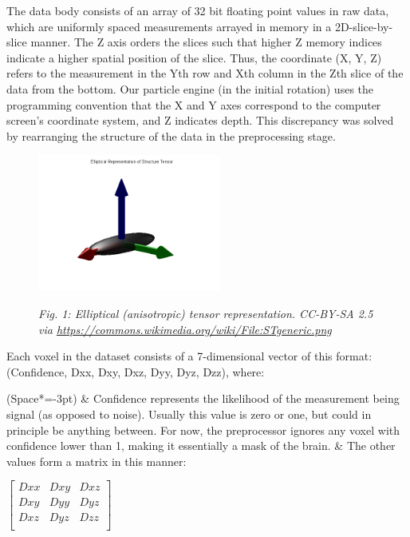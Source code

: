 \documentclass{article}
\begin{document}
The data body consists of an array of 32 bit floating point values in raw data, which are uniformly spaced measurements arrayed in memory in a 2D-slice-by-slice manner. The Z axis orders the slices such that higher Z memory indices indicate a higher spatial position of the slice. Thus, the coordinate (X, Y, Z) refers to the measurement in the Yth row and Xth column in the Zth slice of the data from the bottom. Our particle engine (in the initial rotation) uses the programming convention that the X and Y axes correspond to the computer screen's coordinate system, and Z indicates depth. This discrepancy was solved by rearranging the structure of the data in the preprocessing stage.

\begin{figure}
  \centering
    \includegraphics[width=6cm]{STgeneric}
    \raggedright
    \textit{Fig. 1: Elliptical (anisotropic) tensor representation. CC-BY-SA 2.5 via \url{https://commons.wikimedia.org/wiki/File:STgeneric.png}}
    \vspace{-2cm}
\end{figure}

Each voxel in the dataset consists of a 7-dimensional vector of this format: (Confidence, Dxx, Dxy, Dxz, Dyy, Dyz, Dzz), where:

\begin{easylist}[itemize]
\ListProperties(Space*=-3pt)
& Confidence represents the likelihood of the measurement being signal (as opposed to noise). Usually this value is zero or one, but could in principle be anything between. For now, the preprocessor ignores any voxel with confidence lower than 1, making it essentially a mask of the brain.
& The other values form a matrix in this manner:
\end{easylist}

\hspace{1cm}
\(\begin{bmatrix}
    Dxx & Dxy & Dxz \\
    Dxy & Dyy & Dyz \\
    Dxz & Dyz & Dzz \\
\end{bmatrix}\)
\end{document}
